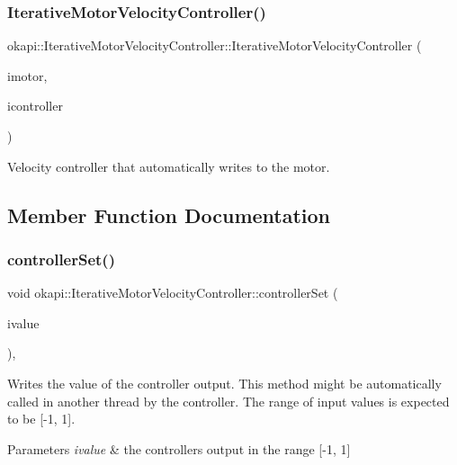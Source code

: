 \subsubsection{\texorpdfstring{IterativeMotorVelocityController()}{IterativeMotorVelocityController()}}
{\footnotesize\ttfamily okapi\+::\+Iterative\+Motor\+Velocity\+Controller\+::\+Iterative\+Motor\+Velocity\+Controller (\begin{DoxyParamCaption}\item[{const std\+::shared\+\_\+ptr$<$ \mbox{\hyperlink{classokapi_1_1AbstractMotor}{Abstract\+Motor}} $>$ \&}]{imotor,  }\item[{const std\+::shared\+\_\+ptr$<$ \mbox{\hyperlink{classokapi_1_1IterativeVelocityController}{Iterative\+Velocity\+Controller}}$<$ double, double $>$$>$ \&}]{icontroller }\end{DoxyParamCaption})}

Velocity controller that automatically writes to the motor. 

\subsection{Member Function Documentation}
\mbox{\label{classokapi_1_1IterativeMotorVelocityController_a5a36064df12b3d34f2bfa09ca1992b9e}} 
\subsubsection{\texorpdfstring{controllerSet()}{controllerSet()}}
{\footnotesize\ttfamily void okapi\+::\+Iterative\+Motor\+Velocity\+Controller\+::controller\+Set (\begin{DoxyParamCaption}\item[{double}]{ivalue }\end{DoxyParamCaption})\hspace{0.3cm}{\ttfamily [override]}, {\ttfamily [virtual]}}

Writes the value of the controller output. This method might be automatically called in another thread by the controller. The range of input values is expected to be {\ttfamily \mbox{[}-\/1, 1\mbox{]}}.


\begin{DoxyParams}{Parameters}
{\em ivalue} & the controller\textquotesingle{}s output in the range {\ttfamily \mbox{[}-\/1, 1\mbox{]}} \\
\hline
\end{DoxyParams}


